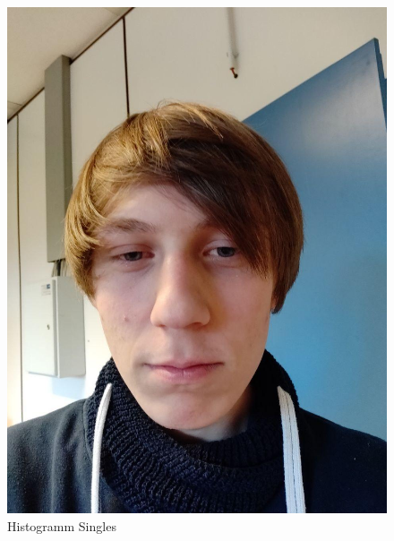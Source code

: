 \documentclass[12pt,twoside,a4paper]{scrartcl}
\begin{document}
		\begin{figure}[H]
				\begin{minipage}{0.49 \textwidth}
					\includegraphics[width=\textwidth]{Pictures/Platzhalter.jpg}
					\caption{Histogramm Singles}
				\end{minipage}
				\begin{minipage}{0.49 \textwidth}

\end{minipage}
\end{figure}
\end{document}
